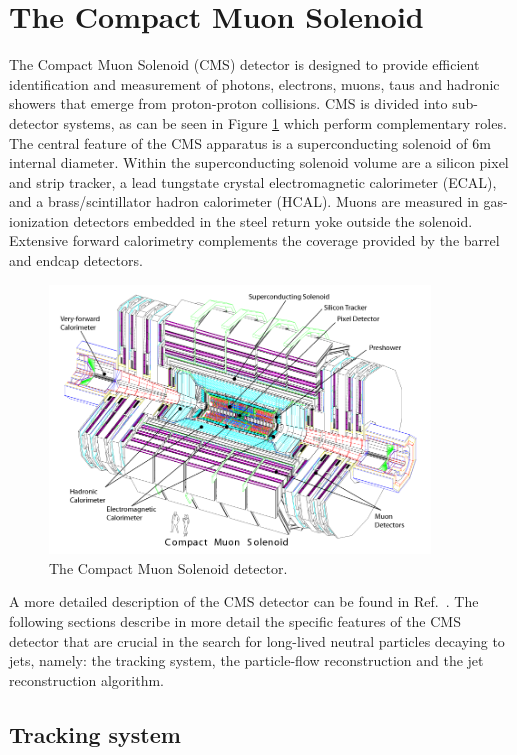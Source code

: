 \section{The Compact Muon Solenoid}

The Compact Muon Solenoid (CMS) detector is designed to provide efficient identification and 
measurement of photons, electrons, muons, taus and hadronic showers that emerge
from proton-proton collisions.
CMS is divided into sub-detector systems, as can be seen in Figure \ref{fig:cms_complete}
which perform complementary roles.
The central feature of the CMS apparatus is a superconducting solenoid of 6\unit{m} internal diameter. Within the superconducting solenoid volume are a silicon pixel and strip tracker, a lead tungstate crystal electromagnetic calorimeter (ECAL), and a brass/scintillator hadron calorimeter (HCAL). Muons are measured in gas-ionization detectors embedded in the steel return yoke outside the solenoid. Extensive forward calorimetry complements the coverage provided by the barrel and endcap detectors. 
\begin{figure}[htbp]
\centering
\includegraphics[width=0.9\textwidth]{plots/intro/cms_complete.png}
\caption{The Compact Muon Solenoid detector.\label{fig:cms_complete}}
\end{figure}

A more detailed description of the CMS detector can be found in Ref.~\cite{Chatrchyan:2008zzk}.  
The following sections describe in more detail the specific features of the CMS detector
that are crucial in the search for long-lived neutral particles decaying to jets, namely: the
tracking system, the particle-flow reconstruction and the jet reconstruction algorithm.

\subsection{Tracking system}
\label{subsec:trackreco}

